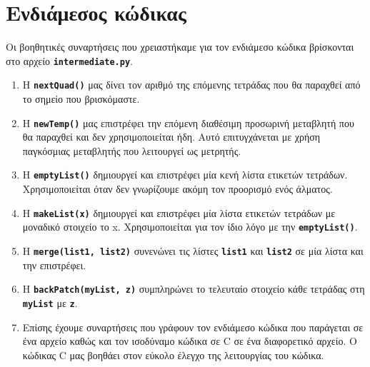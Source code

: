 \documentclass[a4paper]{article}
\let\OldTexttt\texttt
\renewcommand{\texttt}[1]{\OldTexttt{\textbf{#1}}}
\begin{document}
\section{Ενδιάμεσος κώδικας}
Οι βοηθητικές συναρτήσεις που χρειαστήκαμε για τον ενδιάμεσο κώδικα
βρίσκονται στο αρχείο \texttt{intermediate.py}.
\begin{enumerate}
    \item Η \texttt{nextQuad()} μας δίνει τον αριθμό της επόμενης τετράδας
        που θα παραχθεί από το σημείο που βρισκόμαστε.
    \item Η \texttt{newTemp()} μας επιστρέφει την επόμενη διαθέσιμη
        προσωρινή μεταβλητή που θα παραχθεί και δεν χρησιμοποιείται ήδη.
        Αυτό επιτυγχάνεται με χρήση παγκόσμιας μεταβλητής που λειτουργεί ως
        μετρητής.
    \item Η \texttt{emptyList()} δημιουργεί και επιστρέφει μία κενή λίστα
        ετικετών τετράδων. Χρησιμοποιείται όταν δεν γνωρίζουμε ακόμη τον
        προορισμό ενός άλματος.
    \item Η \texttt{makeList(x)} δημιουργεί και επιστρέφει μία λίστα
        ετικετών τετράδων με μοναδικό στοιχείο το x. Χρησιμοποιείται για
        τον ίδιο λόγο με την \texttt{emptyList()}.
    \item Η \texttt{merge(list1, list2)} συνενώνει τις λίστες
        \texttt{list1} και \texttt{list2} σε μία λίστα και την επιστρέφει.
    \item Η \texttt{backPatch(myList, z)} συμπληρώνει το τελευταίο στοιχείο
        κάθε τετράδας στη \texttt{myList} με \texttt{z}.
    \item Επίσης έχουμε συναρτήσεις που γράφουν τον ενδιάμεσο κώδικα που
        παράγεται σε ένα αρχείο καθώς και τον ισοδύναμο κώδικα σε C σε ένα
        διαφορετικό αρχείο. Ο κώδικας C μας βοηθάει στον εύκολο έλεγχο της
        λειτουργίας του κώδικα.
\end{enumerate}
\end{document}
